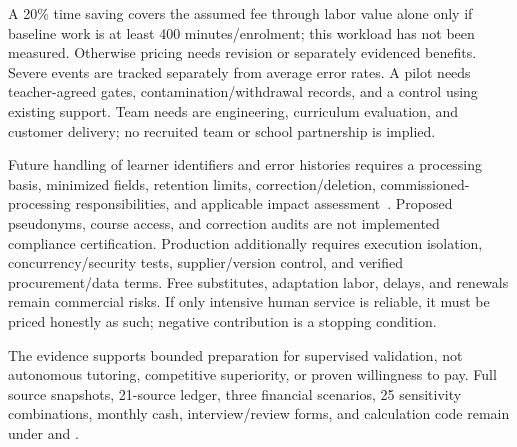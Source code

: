 A 20\% time saving covers the assumed fee through labor value alone only if baseline work is at least 400 minutes/enrolment; this workload has not been measured. Otherwise pricing needs revision or separately evidenced benefits. Severe events are tracked separately from average error rates. A pilot needs teacher-agreed gates, contamination/withdrawal records, and a control using existing support. Team needs are engineering, curriculum evaluation, and customer delivery; no recruited team or school partnership is implied.

Future handling of learner identifiers and error histories requires a processing basis, minimized fields, retention limits, correction/deletion, commissioned-processing responsibilities, and applicable impact assessment~\cite{businesspipl}. Proposed pseudonyms, course access, and correction audits are not implemented compliance certification. Production additionally requires execution isolation, concurrency/security tests, supplier/version control, and verified procurement/data terms. Free substitutes, adaptation labor, delays, and renewals remain commercial risks. If only intensive human service is reliable, it must be priced honestly as such; negative contribution is a stopping condition.

The evidence supports bounded preparation for supervised validation, not autonomous tutoring, competitive superiority, or proven willingness to pay. Full source snapshots, 21-source ledger, three financial scenarios, 25 sensitivity combinations, monthly cash, interview/review forms, and calculation code remain under  and . 
